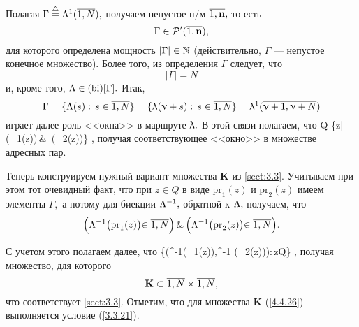 Полагая
$\Gamma \df \La^1(\ov{1,N}),$
получаем непустое п/м
$\ov{1,\mathbf{n}},$ то есть
$$
  \Gamma\in \cp^\prime(\ov{1,\mathbf{n}})
  ,
$$
для которого определена мощность $|\Gamma|\in {\mathbb N}$
(действительно, $\Gamma$ --- непустое конечное множество).
Более того, из определения $\Gamma$ следует, что
$$
  |\Gamma| = N
$$
и, кроме того,
$\Lambda\in (\mathrm{bi})[\Gamma].$
Итак,
$$
  \Gamma = \{\La(s):\,s\in\ov{1,N}\} = \{\la(\nu+ s):\,s\in \ov{1,N}\} = \la^1(\ov{\nu+1,\nu+N})
$$
играет далее роль <<окна>> в маршруте $\uplambda.$
В этой связи полагаем, что
\bfn
  \label{4.4.25}
  Q \df \{z\in {}|\,\bigl(_1(z)\in \Gamma\bigl)\,\&\,
  \bigl(_2(z)\in \Gamma\bigl)\}
  ,
\efn
получая соответствующее <<окно>> в множестве адресных пар.

Теперь конструируем нужный вариант множества $\mathbf{K}$ из \ref{sect:3.3}.
Учитываем при этом тот очевидный факт,
что при $z\in Q$ в виде $\mathrm{pr}_1(z)$
и $\mathrm{pr}_2(z)$ имеем  элементы $\Gamma,$
а потому для биекции $\Lambda^{-1},$
обратной к $\Lambda,$ получаем, что
$$
  \Bigl(\La^{-1}\bigl(\mathrm{pr}_1(z)\bigl)\in \ov{1,N}\Bigl)\,\&\,
  \Bigl(\La^{-1}\bigl(\mathrm{pr}_2(z)\bigl)\in \ov{1,N}\Bigl)
  .
$$

С учетом этого полагаем далее, что
\bfn
  \label{4.4.26}
  \df \Bigl\{\Bigl(\La^{-1}\bigl(_1(z)\bigl),\La^{-1}
  \bigl(_2(z)\bigl)\Bigl):\,z\in Q\Bigl\}
  ,
\efn
получая множество, для которого
$$
  \mathbf{K}\subset \ov{1,N} \times \ov{1,N}
  ,
$$
что соответствует \ref{sect:3.3}.
Отметим, что для множества $\mathbf{K}$
(\ref{4.4.26}) выполняется условие (\ref{3.3.21}).


